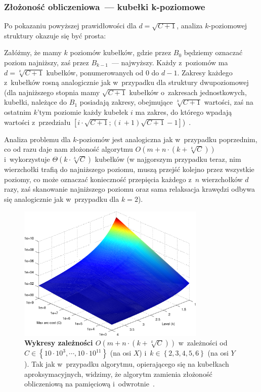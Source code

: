 \subsubsection{Złożoność obliczeniowa~--- kubełki k-poziomowe}

Po pokazaniu powyższej prawidłowości dla $d = \sqrt{C+1}$, analiza $k$-poziomowej struktury okazuje się być prosta:

Załóżmy, że mamy $k$ poziomów kubełków, gdzie przez $B_{0}$ będziemy oznaczać poziom najniższy, zaś przez $B_{k-1}$~--- najwyższy. Każdy z~poziomów ma $d = \sqrt[k]{C+1}$ kubełków, ponumerowanych od $0$ do $d-1$. Zakresy każdego z~kubełków rosną analogicznie jak w~przypadku dla struktury dwupoziomowej (dla najniższego stopnia mamy $\sqrt{C+1}$ kubełków o~zakresach jednostkowych, kubełki, należące do $B_{1}$ posiadają zakresy, obejmujące $\sqrt[k]{C+1}$ wartości, zaś na ostatnim $k$'tym poziomie każdy kubełek $i$ ma zakres, do którego wpadają wartości z~przedziału $ \left[ i \cdot \sqrt{C+1} ; \left( i~+ 1 \right) \sqrt{C+1} - 1 \right]$)~\cite[$4.1$--$4.3$]{NetOpt}.

Analiza problemu dla $k$-poziomów jest analogiczna jak w~przypadku poprzednim, co od razu daje nam złożoność algorytmu $ O \left( m + n \cdot \left( k + \sqrt[k]{C} \right) \right)$ i~wykorzystuje $ \Theta \left( k \cdot \sqrt[k]{C} \right)$ kubełków (w najgorszym przypadku teraz, nim wierzchołki trafią do najniższego poziomu, muszą przejść kolejno przez wszystkie poziomy, co może oznaczać konieczność przepięcia każdego z~$n$ wierzchołków $d$ razy, zaś skanowanie najniższego poziomu oraz sama relaksacja krawędzi odbywa się analogicznie jak w~przypadku dla $k=2$).

\begin{figure}[!htbp]
	\centering
	\includegraphics[width=0.8\textwidth]{Chapter_II/K-LEVEL-BUCKETS-Other/kLevel3DPlot.pdf}
	\caption{}
	\caption{\textbf{Wykresy zależności $ O \left( m + n \cdot \left( k + \sqrt[k]{C} \right) \right) $ } w~zależności od $C \in \left\{ 10 \cdot 10^{3}, \cdots, 10 \cdot 10^{11} \right\}$ (na osi $X$) i~$k \in \left\{ 2, 3, 4, 5, 6 \right\}$ (na osi $Y$). Tak jak w~przypadku algorytmu, opierającego się na kubełkach aproksymacyjnych, widzimy, że algorytm zamienia złożoność obliczeniową na pamięciową i~odwrotnie~\cite[$7.1$--$7.4$]{NetOpt}. }\label{fig:plotKLevelBucketsComplexity}
\end{figure}


